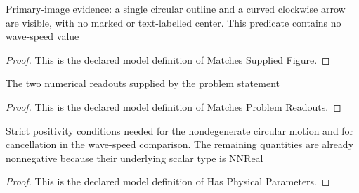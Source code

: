 \begin{definition}
  \label{def:physics:phyx-mini-0306:phyxminiproblems-problemphyxmini0306-matchessuppliedfigure}
  Primary-image evidence: a single circular outline and a curved clockwise arrow are visible, with no marked or text-labelled center. This predicate contains no wave-speed value
\end{definition}
\begin{proof}
  This is the declared model definition of Matches Supplied Figure.
\end{proof}
\begin{definition}
  \label{def:physics:phyx-mini-0306:phyxminiproblems-problemphyxmini0306-matchesproblemreadouts}
  The two numerical readouts supplied by the problem statement
\end{definition}
\begin{proof}
  This is the declared model definition of Matches Problem Readouts.
\end{proof}
\begin{definition}
  \label{def:physics:phyx-mini-0306:phyxminiproblems-problemphyxmini0306-hasphysicalparameters}
  Strict positivity conditions needed for the nondegenerate circular motion and for cancellation in the wave-speed comparison. The remaining quantities are already nonnegative because their underlying scalar type is NNReal
\end{definition}
\begin{proof}
  This is the declared model definition of Has Physical Parameters.
\end{proof}
